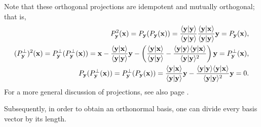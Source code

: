 \label{2011-m-gsp}
Note that these orthogonal projections are idempotent
and mutually orthogonal; that is,
\begin{equation}
\begin{split}
P_{{\bf y}}^2({\bf x})  = P_{{\bf y}}(P_{{\bf y}}({\bf x}) ) =
\frac{\langle {\bf y}\vert {\bf y} \rangle }{\langle {\bf y}\vert {\bf y} \rangle }
\frac{\langle {\bf y} \vert  {\bf x}\rangle }{\langle {\bf y}\vert {\bf y} \rangle }
{\bf y} =P_{{\bf y}}({\bf x}),  \\
%
(P_{{\bf y}}^\perp)^2({\bf x})  = P_{{\bf y}}^\perp(P_{{\bf y}}^\perp({\bf x}) ) =
{\bf x}- \frac{\langle {\bf y} \vert  {\bf x}\rangle }{\langle {\bf y}\vert {\bf y} \rangle }{\bf y}
-\left(
\frac{\langle {\bf y} \vert  {\bf x}\rangle }{\langle {\bf y}\vert {\bf y} \rangle }
-
\frac{\langle {\bf y}\vert {\bf y} \rangle \langle {\bf y} \vert  {\bf x}\rangle
}{\langle {\bf y}\vert {\bf y} \rangle^2 }
\right)
{\bf y}
=P_{{\bf y}}^\perp({\bf x}),  \\
P_{{\bf y}}(P_{{\bf y}}^\perp({\bf x}) ) =  P_{{\bf y}}^\perp(P_{{\bf y}}({\bf x}) ) =
\frac{\langle {\bf y} \vert  {\bf x}\rangle}{\langle {\bf y}\vert {\bf y} \rangle }{\bf y}
-
\frac{\langle {\bf y}\vert {\bf y} \rangle \langle {\bf y} \vert  {\bf x}\rangle }{\langle {\bf y}\vert {\bf y} \rangle^2 }
{\bf y}
=0.
\end{split}
\end{equation}
For a more general discussion of projections, see also page \pageref{2011-m-projec}.

Subsequently, in order to obtain an orthonormal basis,
one can divide every basis vector by its length.

